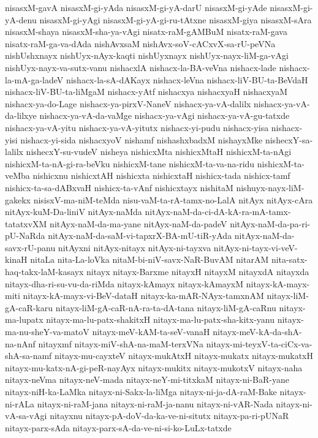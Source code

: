 {nisasxM-gavA
nisasxM-gi-yAda
nisasxM-gi-yA-darU
nisasxM-gi-yAde
nisasxM-gi-yA-denu
nisasxM-gi-yAgi
nisasxM-gi-yA-gi-ru-tAtxne
nisasxM-giya
nisasxM-sAra
nisasxM-shaya
nisasxM-sha-ya-vAgi
nisatx-raM-gAMBuM
nisatx-raM-gava
nisatx-raM-ga-va-dAda
nishAvxsaM
nishAvx-soV-cACxvX-sa-rU-peVNa
nishUshxnayx
nishUyx-nAyx-kaqti
nishUyxnayx
nishUyx-nayx-liM-ga-vAgi
nishUyx-nayx-va-sutx-vanu
nishacxlA
nishacx-la-BA-veVna
nishacx-lade
nishacx-la-mA-ga-ladeV
nishacx-la-sA-dAKayx
nishacx-leVna
nishacx-liV-BU-ta-BeVdaH
nishacx-liV-BU-ta-liMgaM
nishacx-yAtf
nishacxya
nishacxyaH
nishacxyaM
nishacx-ya-do-Lage
nishacx-ya-pirxV-NaneV
nishacx-ya-vA-dalilx
nishacx-ya-vA-da-lilxye
nishacx-ya-vA-da-vaMge
nishacx-ya-vAgi
nishacx-ya-vA-gu-tatxde
nishacx-ya-vA-yitu
nishacx-ya-vA-yitutx
nishacx-yi-pudu
nishacx-yisa
nishacx-yisi
nishacx-yi-sida
nishacxyoV
nishamf
nishashxbadxM
nishayxMke
nishecxY-sa-lalilx
nishecxY-su-vudeV
nisheya
nishicxMta
nishicxMtaH
nishicxM-ta-nAgi
nishicxM-ta-nA-gi-ra-beVku
nishicxM-tane
nishicxM-ta-va-na-ridu
nishicxM-ta-veMba
nishicxnu
nishicxtAH
nishicxta
nishicxtaH
nishicx-tada
nishicx-tamf
nishicx-ta-sa-dABxvaH
nishicx-ta-vAnf
nishicxtayx
nishitaM
nishuyx-nayx-liM-gakekx
nisisxV-ma-niM-teMda
nisu-vaM-ta-rA-tamx-no-LalA
nitAyx
nitAyx-cAra
nitAyx-kuM-Da-liniV
nitAyx-naMda
nitAyx-naM-da-ci-dA-kA-ra-mA-tamx-tatatxvXM
nitAyx-naM-da-ma-yane
nitAyx-naM-da-padeV
nitAyx-naM-da-pa-ri-pU-NaRda
nitAyx-naM-da-saM-vi-tapxrX-BA-mU-tiR-yAda
nitAyx-naM-da-savx-rU-panu
nitAyxni
nitAyx-nitayx
nitAyx-ni-tayxva
nitAyx-ni-tayx-vi-veV-kinaH
nitaLa
nita-La-loVka
nitaM-bi-niV-savx-NaR-BuvAM
nitarAM
nita-satx-haq-takx-laM-kasayx
nitayx
nitayx-Barxme
nitayxH
nitayxM
nitayxdA
nitayxda
nitayx-dha-ri-su-vu-da-riMda
nitayx-kAmayx
nitayx-kAmayxM
nitayx-kA-mayx-miti
nitayx-kA-mayx-vi-BeV-dataH
nitayx-ka-mAR-NAyx-tamxnAM
nitayx-liM-gA-caR-karu
nitayx-liM-gA-caR-nA-ra-ta-dA-tana
nitayx-liM-gA-caRnu
nitayx-ma-lupatx
nitayx-ma-lu-patx-shakitxH
nitayx-ma-lu-patx-sha-kitx-yanu
nitayx-ma-nu-sheY-va-matoV
nitayx-meV-kAM-ta-seV-vanaH
nitayx-meV-kA-da-shA-na-nAnf
nitayxmf
nitayx-miV-shA-na-maM-terxVNa
nitayx-mi-teyxV-ta-ciCx-va-shA-sa-namf
nitayx-mu-cayxteV
nitayx-mukAtxH
nitayx-mukatx
nitayx-mukatxH
nitayx-mu-katx-nA-gi-peR-nayAyx
nitayx-mukitx
nitayx-mukotxV
nitayx-naha
nitayx-neVma
nitayx-neV-mada
nitayx-neY-mi-titxkaM
nitayx-ni-BaR-yane
nitayx-niH-ka-LaMka
nitayx-ni-Sakx-la-liMga
nitayx-ni-ja-dA-raM-Bake
nitayx-ni-rALa
nitayx-ni-raM-jana
nitayx-ni-raM-ja-nanu
nitayx-ni-vAR-Nada
nitayx-ni-vA-sa-vAgi
nitayxnu
nitayx-pA-doV-da-ka-ve-ni-situtx
nitayx-pa-ri-pUNaR
nitayx-parx-sAda
nitayx-parx-sA-da-ve-ni-si-ko-LuLx-tatxde
}
